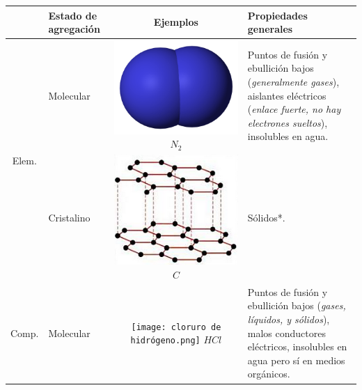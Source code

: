 \documentclass{book}
\begin{document}
\begin{tabular}{| c || m{2cm} | c m{8cm} |}
  \hline
  & Estado de agregación & Ejemplos & Propiedades generales \\
  \hline
  \multirow{2}{3em}{Elem.} & Molecular & \includegraphics[scale=0.025]{dinitrogeno.png} \textit{$ N_{2} $} & Puntos de fusión y ebullición bajos (\textit{generalmente gases}),
                                                                                                              aislantes eléctricos (\textit{enlace fuerte, no hay electrones sueltos}), 
                                                                                                              insolubles en agua. \\ [1ex]
                           & Cristalino  & \includegraphics[scale=0.1]{grafito.png} \textit{$ C $} & Sólidos*. \\ [1 ex]
  \hline
  \multirow{2}{3em}{Comp.} & Molecular & \texttt{[image: cloruro de hidrógeno.png]} \textit{$ HCl $} & Puntos de fusión y ebullición bajos (\textit{gases, líquidos, y sólidos}),
                                                                                                                     malos conductores eléctricos, insolubles en agua pero sí en medios orgánicos.\\


\end{tabular}
\end{document}
